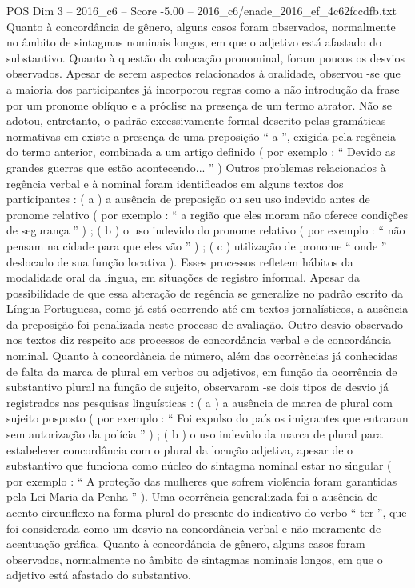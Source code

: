 \begin{textsample}{POS Dim 3 – 2016\_c6 – Score -5.00 – 2016\_c6/enade\_2016\_ef\_4c62fccdfb.txt}
Quanto à concordância de gênero, alguns casos foram observados, normalmente no âmbito de sintagmas nominais longos, em que o adjetivo está afastado do substantivo.
Quanto à questão da colocação pronominal, foram poucos os desvios observados.
Apesar de serem aspectos relacionados à oralidade, observou -se que a maioria dos participantes já incorporou regras como a não introdução da frase por um pronome oblíquo e a próclise na presença de um termo atrator.
Não se adotou, entretanto, o padrão excessivamente formal descrito pelas gramáticas normativas em existe a presença de uma preposição “ a ”, exigida pela regência do termo anterior, combinada a um artigo definido ( por exemplo : “ Devido as grandes guerras que estão acontecendo... ” ) Outros problemas relacionados à regência verbal e à nominal foram identificados em alguns textos dos participantes : ( a ) a ausência de preposição ou seu uso indevido antes de pronome relativo ( por exemplo : “ a região que eles moram não oferece condições de segurança ” ) ; ( b ) o uso indevido do pronome relativo ( por exemplo : “ não pensam na cidade para que eles vão ” ) ; ( c ) utilização de pronome “ onde ” deslocado de sua função locativa ).
Esses processos refletem hábitos da modalidade oral da língua, em situações de registro informal.
Apesar da possibilidade de que essa alteração de regência se generalize no padrão escrito da Língua Portuguesa, como já está ocorrendo até em textos jornalísticos, a ausência da preposição foi penalizada neste processo de avaliação.
Outro desvio observado nos textos diz respeito aos processos de concordância verbal e de concordância nominal.
Quanto à concordância de número, além das ocorrências já conhecidas de falta da marca de plural em verbos ou adjetivos, em função da ocorrência de substantivo plural na função de sujeito, observaram -se dois tipos de desvio já registrados nas pesquisas linguísticas : ( a ) a ausência de marca de plural com sujeito posposto ( por exemplo : “ Foi expulso do país os imigrantes que entraram sem autorização da polícia ” ) ; ( b ) o uso indevido da marca de plural para estabelecer concordância com o plural da locução adjetiva, apesar de o substantivo que funciona como núcleo do sintagma nominal estar no singular ( por exemplo : “ A proteção das mulheres que sofrem violência foram garantidas pela Lei Maria da Penha ” ).
Uma ocorrência generalizada foi a ausência de acento circunflexo na forma plural do presente do indicativo do verbo “ ter ”, que foi considerada como um desvio na concordância verbal e não meramente de acentuação gráfica.
Quanto à concordância de gênero, alguns casos foram observados, normalmente no âmbito de sintagmas nominais longos, em que o adjetivo está afastado do substantivo.

\end{textsample}
